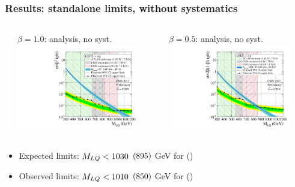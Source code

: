 \documentclass[bigger]{beamer}
\begin{document}
\begin{frame}
\frametitle{Results: standalone limits, without systematics}
\label{sec-5-1-2}
\begin{columns} %
\label{sec-5-1-2-1}
\begin{column}{0.5\textwidth}
\label{sec-5-1-2-1-1}

\centering
$\beta = 1.0$: \eejj analysis, no syst.
\includegraphics[width=0.875\textwidth]{fig/limits/BR_Sigma_EE_noSyst.pdf}
\end{column}
\begin{column}{0.5\textwidth}
\label{sec-5-1-2-1-2}

\centering
$\beta = 0.5$: \enujj analysis, no syst.
\includegraphics[width=0.875\textwidth]{fig/limits/BR_Sigma_ENu_noSyst.pdf}
\end{column}
\end{columns}
\label{sec-5-1-2-2}

\begin{itemize}
\item Expected limits: $M_{LQ} < 1030$ $(895)$ GeV for \eejj (\enujj)
\item Observed limits: $M_{LQ} < 1010$ $(850)$ GeV for \eejj (\enujj)
\end{itemize}
\end{frame}
\end{document}
